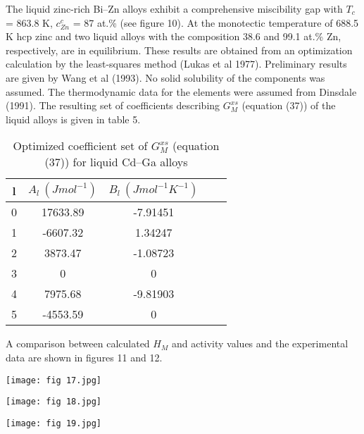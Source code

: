 \documentclass[12pt]{article}
\newcommand*{\1}{\hspace{1pt}}
\begin{document}
    The liquid zinc-rich Bi–Zn alloys exhibit a comprehensive miscibility
    gap with $T _c$ = 863.8 K,  $c^{c}_{Zn}$  = 87 at.\% (see figure 10). At the monotectic temperature
    of 688.5 K hcp zinc and two liquid alloys with the composition 38.6 and 99.1 at.\% Zn, 
    respectively, are in equilibrium. These results are obtained from an optimization calculation
    by the least-squares method (Lukas et al 1977). Preliminary results are given by Wang et al
    (1993). No solid solubility of the components was assumed. The thermodynamic data for the
    elements were assumed from Dinsdale (1991). The resulting set of coefficients describing $G^{xs}_M$
    (equation (37)) of the liquid alloys is given in table 5.
    \begin{table}[t!]
        \centering
        \caption{Optimized coefficient set of $G ^ {xs} _ {M}$ 
        (equation (37)) for liquid Cd–Ga alloys}
        \begin{tabular}{|c | c | c | c | c |} 
        \hline
        l & $A_l \ (J mol^{-1})$ & $B_l \ (J mol^{-1}K^{-1})$ \\ [0.5ex] 
        \hline\hline
        0 & 17633.89 & -7.91451  \\ 
        1 & -6607.32 & 1.34247 \\
        2 & 3873.47 & -1.08723 \\
        3 & 0 & 0\\
        4 & 7975.68 & -9.81903 \\
        5 & -4553.59 & 0 \\ [1ex] 
        \hline
        \end{tabular}
        \end{table}
    A comparison between calculated $H _M$ and activity values and the experimental data are shown 
    in figures 11 and 12.
    \begin{adjustbox}{center,caption={Calculated (continuous curve) phase diagram using the coefficient set given in
        table 5. },label={somelabel},nofloat=figure,vspace=\bigskipamount}
        \texttt{[image: fig 17.jpg]}
    \end{adjustbox}
    \begin{adjustbox}{center,caption={Calculated (continuous curve) enthalpy of mixing of liquid 
        Bi–Zn alloys using the
        coefficient set given in table 5. },label={somelabel},nofloat=figure,vspace=\bigskipamount}
        \texttt{[image: fig 18.jpg]}
    \end{adjustbox}
    \begin{adjustbox}{center,caption={Calculated (continuous curve) activity of liquid Bi–Zn alloy at 873 K using the
        coefficient set given in table 5.  },label={somelabel},nofloat=figure,vspace=\bigskipamount}
        \texttt{[image: fig 19.jpg]}
    \end{adjustbox}
\end{document}
